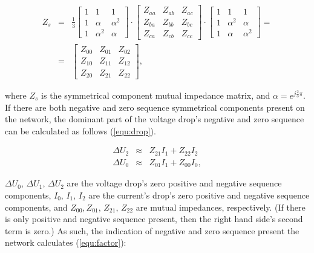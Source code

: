             \begin{equation}
                \begin{array}{rcl}
                       Z_s&=&\frac{1}{3}\begin{bmatrix} 1&1&1\\1&\alpha&\alpha^2\\1&\alpha^2&\alpha \end{bmatrix}\cdot
                                        \begin{bmatrix} Z_{aa}&Z_{ab}&Z_{ac}\\Z_{ba}&Z_{bb}&Z_{bc}\\Z_{ca}&Z_{cb}&Z_{cc} \end{bmatrix}\cdot
                                        \begin{bmatrix} 1&1&1\\1&\alpha^2&\alpha\\1&\alpha&\alpha^2\end{bmatrix}=\\
                          &=&  \begin{bmatrix} Z_{00}&Z_{01}&Z_{02}\\Z_{10}&Z_{11}&Z_{12}\\Z_{20}&Z_{21}&Z_{22} \end{bmatrix},

                \end{array}
                \label{equ:mutual}
            \end{equation}

where $Z_s$ is the symmetrical component mutual impedance matrix, and $\alpha=e^{j\frac{2}{3}\pi}$. If there are both negative and zero sequence symmetrical components present on the network, the dominant part of the voltage drop's negative and zero sequence can be calculated as follows (\ref{equ:drop}).

            \begin{equation}
                \begin{array}{rcl}
                       \Delta U_2&\approx&Z_{21}I_1+Z_{22}I_2\\
                       \Delta U_0&\approx&Z_{01}I_1+Z_{00}I_0,
                \end{array}
                \label{equ:drop}
            \end{equation}

$\Delta U_0,\,\Delta U_1,\,\Delta U_2$ are the voltage drop's zero positive and negative sequence components, $I_0,\,I_1,\,I_2$ are the current's drop's zero positive and negative sequence components, and $Z_{00},Z_{01},\,Z_{21},\,Z_{22}$ are mutual impedances,  respectively. (If there is only positive and negative sequence present, then the right hand side's second term is zero.) As such, the indication of negative and zero sequence present the network calculates (\ref{equ:factor}):

